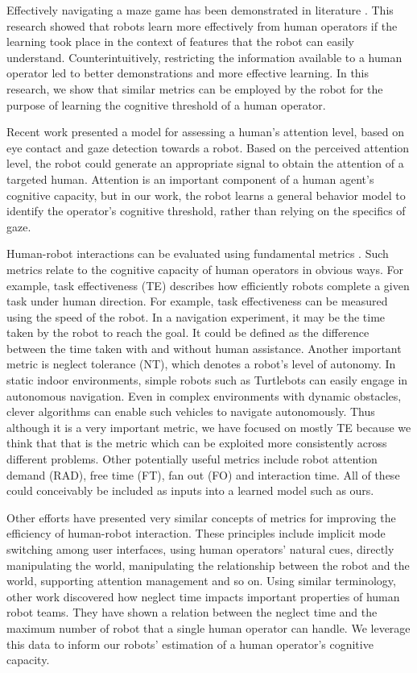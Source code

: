 \documentclass{sig-alternate}
\begin{document}
Effectively navigating a maze game has been demonstrated in literature
\cite{crick2011human}.  This research showed that robots learn more
effectively from human operators if the learning took place in the
context of features that the robot can easily understand.
Counterintuitively, restricting the information available to a human
operator led to better demonstrations and more effective learning.  In
this research, we show that similar metrics can be employed by the
robot for the purpose of learning the cognitive threshold of a human
operator.

Recent work \cite{das2013attention,Hoque:2012:ACH:2157689.2157729}
presented a model for assessing a human's attention level, based on
eye contact and gaze detection towards a robot. Based on the perceived
attention level, the robot could generate an appropriate signal to
obtain the attention of a targeted human.  Attention is an important
component of a human agent's cognitive capacity, but in our work, the
robot learns a general behavior model to identify the operator's
cognitive threshold, rather than relying on the specifics of gaze.

Human-robot interactions can be evaluated using fundamental metrics
\cite{olsen2003metrics}. Such metrics relate to the cognitive capacity
of human operators in obvious ways. For example, task effectiveness
(TE) describes how efficiently robots complete a given task under
human direction.  For example, task effectiveness can be measured
using the speed of the robot. In a navigation experiment, it may be
the time taken by the robot to reach the goal.  It could be defined as
the difference between the time taken with and without human
assistance.  Another important metric is neglect tolerance (NT), which
denotes a robot's level of autonomy. In static indoor environments,
simple robots such as Turtlebots can easily engage in autonomous
navigation. Even in complex environments with dynamic obstacles,
clever algorithms \cite{montemerlo2008junior} can enable such vehicles
to navigate autonomously. Thus although it is a very important metric,
we have focused on mostly TE because we think that that is the metric
which can be exploited more consistently across different problems.
Other potentially useful metrics include robot attention demand (RAD),
free time (FT), fan out (FO) and interaction time.  All of these could
conceivably be included as inputs into a learned model such as ours.

Other efforts \cite{goodrich2003seven, olsen2003metrics} have
presented very similar concepts of metrics for improving the
efficiency of human-robot interaction. These principles include
implicit mode switching among user interfaces, using human operators'
natural cues, directly manipulating the world, manipulating the
relationship between the robot and the world, supporting attention
management and so on. Using similar terminology, other work
\cite{crandall2005validating} discovered how neglect time impacts
important properties of human robot teams. They have shown a relation
between the neglect time and the maximum number of robot that a single
human operator can handle.  We leverage this data to inform our
robots' estimation of a human operator's cognitive capacity.
\end{document}
